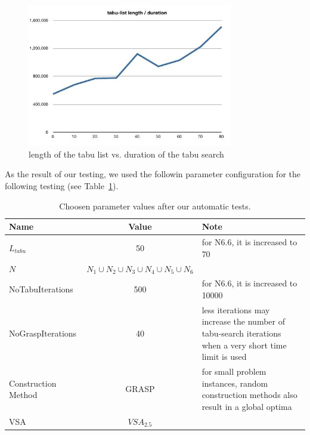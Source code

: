 \documentclass[a4paper,11pt]{article}
\begin{document}
\begin{figure}[htb]
  \begin{center}
    \includegraphics[width=0.8\textwidth]{images/tabulist-len-duration}
  \end{center}
  \caption{length of the tabu list vs. duration of the tabu search}
  \label{fig:tabu_len_dur}
\end{figure}

As the result of our testing, we used the followin parameter configuration for the following testing (see Table~\ref{tab:param-1}).

\begin{center}
  \begin{table}[htb]
    \begin{tabularx}{\linewidth}{| l | c | X | }
      \hline                       
      Name & Value & Note \\   \hline     \hline    
      $L_{tabu}$ & 50 & for N6.6, it is increased to 70 \\ \hline    
      $N$ &  $N_1 \cup N_2 \cup N_3 \cup N_4 \cup N_5 \cup N_6$ &  \\ \hline   
      NoTabuIterations & 500  &for N6.6, it is increased to 10000 \\ \hline  
      NoGraspIterations &  40 & less iterations may increase the number of tabu-search iterations when a very short time limit is used \\ \hline 
      Construction Method & GRASP  & for small problem instances, random construction methods also result in a global optima \\ \hline 
      VSA & $VSA_{2.5}$  & \\ \hline 
    \end{tabularx}
    \caption{Choosen parameter values after our automatic tests.}
  \label{tab:param-1}
  \end{table}
\end{center}
\end{document}

